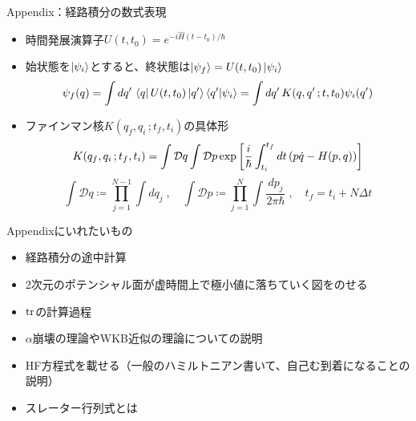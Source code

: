 \documentclass[14pt,aspectratio=169,xcolor=dvipsnames,table,dvipdfmx]{beamer}
\theoremstyle{definition}
\begin{document}
\begin{frame}[noframenumbering]{Appendix：経路積分の数式表現}
  \begin{itemize}
    \item 時間発展演算子$U(t,t_0)=e^{-i\hat{H}(t-t_0)/\hbar}$
    \item 始状態を$\ket{\psi_i}$とすると、終状態は$\ket{\psi_f}=U(t,t_0)\ket{\psi_i}$
          \begin{equation*}
            \psi_f(q) = \int dq'\,\bra{q}U(t,t_0)\ket{q'}\bra{q'}\ket{\psi_i}
            = \int dq'\,K(q,q'\,;t,t_0)\psi_i(q')
          \end{equation*}
    \item ファインマン核$K(q_f,q_i\,;t_f,t_i)$の具体形
          \begin{equation*}
            K(q_f,q_i\,;t_f,t_i) = \int\mathcal{D}q\int\mathcal{D}p
            \exp\qty[\frac{i}{\hbar}\int_{t_i}^{t_f}dt\,(p\dot{q}-H(p,q))]
          \end{equation*}
          \begin{equation*}
            \int \mathcal{D}q \coloneqq \prod_{j=1}^{N-1} \int dq_j\;,\quad
            \int \mathcal{D}p \coloneqq \prod_{j=1}^N \int \frac{dp_j}{2\pi\hbar}\;,\quad
            t_f = t_i + N\varDelta t
          \end{equation*}
  \end{itemize}
\end{frame}

\begin{frame}[noframenumbering]{Appendixにいれたいもの}
  \begin{itemize}
    \item 経路積分の途中計算
    \item 2次元のポテンシャル面が虚時間上で極小値に落ちていく図をのせる
    \item $\trace$の計算過程
    \item $\alpha$崩壊の理論やWKB近似の理論についての説明
    \item HF方程式を載せる（一般のハミルトニアン書いて、自己む到着になることの説明）
    \item スレーター行列式とは
  \end{itemize}
\end{frame}
\end{document}

